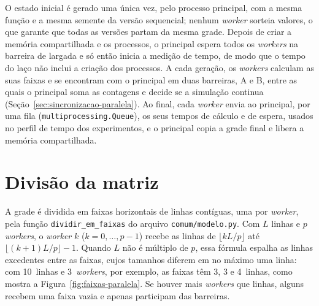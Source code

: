 O estado inicial é gerado uma única vez, pelo processo principal, com a mesma função e a mesma semente da versão sequencial; nenhum \textit{worker} sorteia valores, o que garante que todas as versões partam da mesma grade. Depois de criar a memória compartilhada e os processos, o principal espera todos os \textit{workers} na barreira de largada e só então inicia a medição de tempo, de modo que o tempo do laço não inclui a criação dos processos. A cada geração, os \textit{workers} calculam as suas faixas e se encontram com o principal em duas barreiras, A e B, entre as quais o principal soma as contagens e decide se a simulação continua (Seção~\ref{sec:sincronizacao-paralela}). Ao final, cada \textit{worker} envia ao principal, por uma fila (\texttt{multiprocessing.Queue}), os seus tempos de cálculo e de espera, usados no perfil de tempo dos experimentos, e o principal copia a grade final e libera a memória compartilhada.

\section{Divisão da matriz}\label{sec:divisao-paralela}

A grade é dividida em faixas horizontais de linhas contíguas, uma por \textit{worker}, pela função \texttt{dividir\_em\_faixas} do arquivo \texttt{comum/modelo.py}. Com $L$ linhas e $p$ \textit{workers}, o \textit{worker} $k$ ($k = 0, \dots, p-1$) recebe as linhas de $\lfloor kL/p \rfloor$ até $\lfloor (k+1)L/p \rfloor - 1$. Quando $L$ não é múltiplo de $p$, essa fórmula espalha as linhas excedentes entre as faixas, cujos tamanhos diferem em no máximo uma linha: com 10~linhas e 3~\textit{workers}, por exemplo, as faixas têm 3, 3 e 4~linhas, como mostra a Figura~\ref{fig:faixas-paralela}. Se houver mais \textit{workers} que linhas, alguns recebem uma faixa vazia e apenas participam das barreiras.

